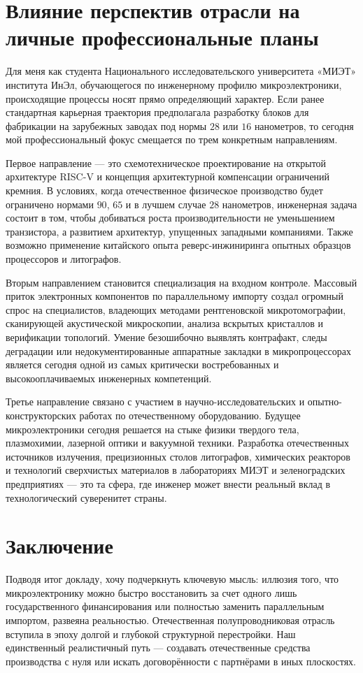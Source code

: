 \documentclass[12pt,a4paper]{article}
\begin{document}
\section{Влияние перспектив отрасли на личные профессиональные планы}

Для меня как студента Национального исследовательского университета 
«МИЭТ» института ИнЭл, обучающегося по инженерному профилю 
микроэлектроники, происходящие процессы носят прямо определяющий 
характер. Если ранее стандартная карьерная траектория предполагала 
разработку блоков для фабрикации на зарубежных заводах под нормы $28$ 
или $16$ нанометров, то сегодня мой профессиональный фокус смещается по 
трем конкретным направлениям.

Первое направление --- это схемотехническое проектирование на открытой 
архитектуре RISC-V и концепция архитектурной компенсации ограничений 
кремния. В условиях, когда отечественное физическое производство будет 
ограничено нормами $90$, $65$ и в лучшем случае $28$ нанометров, инженерная 
задача состоит в том, чтобы добиваться роста производительности не 
уменьшением транзистора, а развитием архитектур, упущенных западными
компаниями. Также возможно применение китайского опыта реверс-инжиниринга
опытных образцов процессоров и литографов.

Вторым направлением становится специализация на входном контроле. 
Массовый приток электронных 
компонентов по параллельному импорту создал огромный спрос на 
специалистов, владеющих методами рентгеновской микротомографии, 
сканирующей акустической микроскопии, анализа вскрытых кристаллов и 
верификации топологий. Умение безошибочно выявлять контрафакт, следы 
деградации или недокументированные аппаратные закладки в 
микропроцессорах является сегодня одной из самых критически 
востребованных и высокооплачиваемых инженерных компетенций.

Третье направление связано с участием в научно-исследовательских и 
опытно-конструкторских работах по отечественному оборудованию. 
Будущее микроэлектроники сегодня решается на стыке физики твердого 
тела, плазмохимии, лазерной оптики и вакуумной техники. Разработка 
отечественных источников излучения, прецизионных столов литографов, 
химических реакторов и технологий сверхчистых материалов в лабораториях 
МИЭТ и зеленоградских предприятиях --- это та сфера, где 
инженер может внести реальный вклад в технологический суверенитет 
страны.

\section{Заключение}

Подводя итог докладу, хочу подчеркнуть ключевую мысль: иллюзия того, 
что микроэлектронику можно быстро восстановить за счет одного лишь 
государственного финансирования или полностью заменить параллельным 
импортом, развеяна реальностью. Отечественная полупроводниковая отрасль 
вступила в эпоху долгой и глубокой структурной перестройки. Наш 
единственный реалистичный путь --- создавать отечественные средства 
производства с нуля или искать договорённости с партнёрами в иных 
плоскостях.
\end{document}
